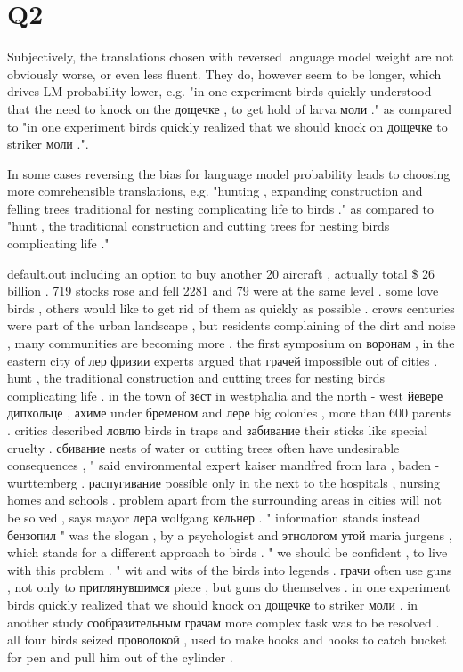 \section*{Q2}

Subjectively, the translations chosen with reversed language model weight are not obviously worse, or even less fluent. They do, however seem to be longer, which drives LM probability lower, e.g. "in one experiment birds quickly understood that the need to knock on the дощечке , to get hold of larva моли ." as compared to "in one experiment birds quickly realized that we should knock on дощечке to striker моли .".

In some cases reversing the bias for language model probability leads to choosing more comrehensible translations, e.g. "hunting , expanding construction and felling trees traditional for nesting complicating life to birds ." as compared to "hunt , the traditional construction and cutting trees for nesting birds complicating life ."



default.out 
including an option to buy another 20 aircraft , actually total \$ 26 billion .
719 stocks rose and fell 2281 and 79 were at the same level .
some love birds , others would like to get rid of them as quickly as possible . crows centuries were part of the urban landscape , but residents complaining of the dirt and noise , many communities are becoming more .
the first symposium on воронам , in the eastern city of лер фризии experts argued that грачей impossible out of cities .
hunt , the traditional construction and cutting trees for nesting birds complicating life .
in the town of зест in westphalia and the north - west йевере дипхольце , ахиме under бременом and лере big colonies , more than 600 parents .
critics described ловлю birds in traps and забивание their sticks like special cruelty .
сбивание nests of water or cutting trees often have undesirable consequences , " said environmental expert kaiser mandfred from lara , baden - wurttemberg .
распугивание possible only in the next to the hospitals , nursing homes and schools .
problem apart from the surrounding areas in cities will not be solved , says mayor лера wolfgang кельнер .
" information stands instead бензопил " was the slogan , by a psychologist and этнологом утой maria jurgens , which stands for a different approach to birds . " we should be confident , to live with this problem . "
wit and wits of the birds into legends . грачи often use guns , not only to приглянувшимся piece , but guns do themselves .
in one experiment birds quickly realized that we should knock on дощечке to striker моли .
in another study сообразительным грачам more complex task was to be resolved .
all four birds seized проволокой , used to make hooks and hooks to catch bucket for pen and pull him out of the cylinder .


